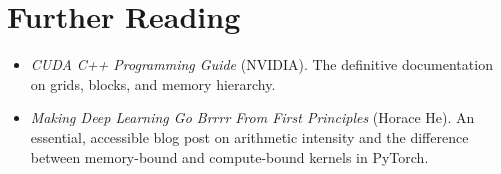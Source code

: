 \section{Further Reading}
\label{ch:04:sec:further}

\begin{itemize}
  \item \textit{CUDA C++ Programming Guide} (NVIDIA). The definitive documentation on grids, blocks, and memory hierarchy.
  \item \textit{Making Deep Learning Go Brrrr From First Principles} (Horace He). An essential, accessible blog post on arithmetic intensity and the difference between memory-bound and compute-bound kernels in PyTorch.
\end{itemize}
